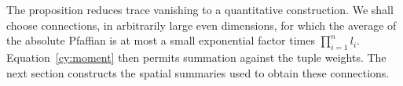 The proposition reduces trace vanishing to a quantitative construction.
We shall choose connections, in arbitrarily large even dimensions,
for which the average of the absolute Pfaffian is at most a small
exponential factor times $\prod_{i=1}^n l_i$.
Equation~\eqref{cy:moment} then permits summation against the tuple
weights. The next section constructs the spatial summaries used to
obtain these connections.
